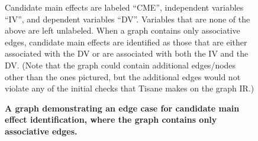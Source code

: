 {\begin{figure}[H]
\begin{tikzpicture}
        \end{tikzpicture}
        \caption{\textbf{A graph demonstrating an edge case for candidate main effect identification, where the graph contains only associative edges.}}
            \begin{small}
            \begin{minipage}{\linewidth}
                Candidate main effects are labeled ``CME'', independent variables ``IV'', and dependent variables ``DV''. Variables that are none of the above are left unlabeled. When a graph contains only associative edges, candidate main effects are identified as those that are either associated with the DV or are associated with both the IV and the DV. (Note that the graph could contain additional edges/nodes other than the ones pictured, but the additional edges would not violate any of the initial checks that Tisane makes on the graph IR.)
            \end{minipage}
            \end{small}
        \label{fig:figureOnlyAssociatesOrCausesEdgesCandidateMainEffects}
    \end{figure}
}

